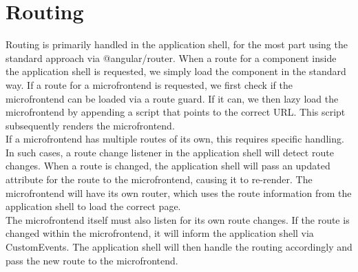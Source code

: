 \section{Routing}
Routing is primarily handled in the application shell, for the most part using the standard approach via @angular/router. When a route for a component inside the application shell is requested, we simply load the component in the standard way. If a route for a microfrontend is requested, we first check if the microfrontend can be loaded via a route guard. If it can, we then lazy load the microfrontend by appending a script that points to the correct URL. This script subsequently renders the microfrontend. \\

\noindent
If a microfrontend has multiple routes of its own, this requires specific handling. In such cases, a route change listener in the application shell will detect route changes. When a route is changed, the application shell will pass an updated attribute for the route to the microfrontend, causing it to re-render. The microfrontend will have its own router, which uses the route information from the application shell to load the correct page. \\

\noindent
The microfrontend itself must also listen for its own route changes. If the route is changed within the microfrontend, it will inform the application shell via CustomEvents. The application shell will then handle the routing accordingly and pass the new route to the microfrontend. 